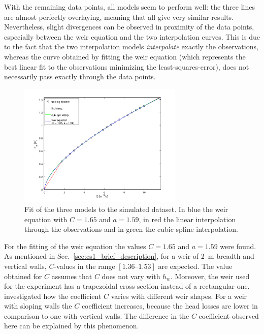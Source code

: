 With the remaining data points, all models seem to perform well: the three lines are almost perfectly overlaying, meaning that all give very similar results.
Nevertheless, slight divergences can be observed in proximity of the data points, especially between the weir equation and the two interpolation curves. This is due to the fact that the two interpolation models \emph{interpolate} exactly the observations, whereas the curve obtained by fitting the weir equation (which represents the best linear fit to the observations minimizing the least-squares-error), does not necessarily pass exactly through the data points.

\begin{figure}[h]
  \centering
  \includegraphics[width=0.7\textwidth]{Figures/fitting_results.png}
  \caption{Fit of the three models to the simulated dataset. In blue the weir equation with $C = \num{1.65}$ and $a = \num{1.59}$, in red the linear interpolation through the observations and in green the cubic spline interpolation.}
  \label{fig:fitting_results}
\end{figure}

For the fitting of the weir equation the values $C = 1.65$ and $a = 1.59$ were found.
As mentioned in Sec.~\ref{sec:cs1_brief_description}, for a weir of \SI{2}{\m} breadth and vertical walls, $C$-values in the range $[\numrange{1.36}{1.53}]$ are expected.
The value obtained for $C$ assumes that $C$ does not vary with $h_w$.
Moreover, the weir used for the experiment has a trapezoidal cross section instead of a rectangular one.
\cite{tracy_discharge_1957} investigated how the coefficient $C$ varies with different weir shapes.
For a weir with sloping walls the $C$ coefficient increases, because the head losses are lower in comparison to one with vertical walls.
The difference in the $C$ coefficient observed here can be explained by this phenomenon.\\

